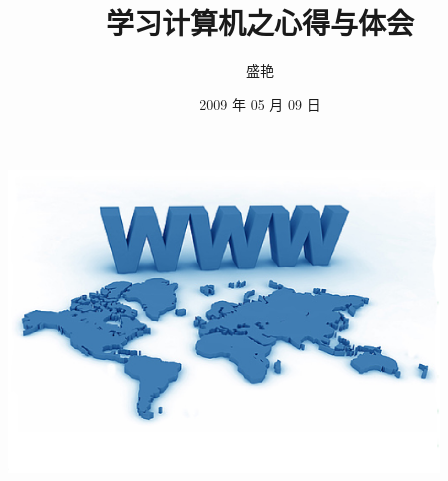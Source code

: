 \documentclass[dvipdfm]{beamer}
\title{学习计算机之心得与体会}
\author{盛艳 }
\institute{<shengyan1985@gmail.com>}
\date{2009 年 05 月 09 日}
\begin{document}
\begin{frame}
  \titlepage
\end{frame}

\begin{frame}[t]{}
  \vspace{1em}
  \begin{center}
  \includegraphics[height=8cm]{figure/www.eps}
  \end{center}
\end{frame}
\end{document}
